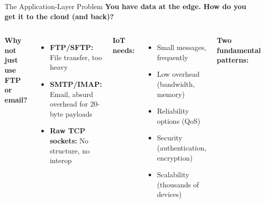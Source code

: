 \documentclass[aspectratio=169,11pt]{beamer}
\begin{document}
\begin{frame}{The Application-Layer Problem}
    \textbf{You have data at the edge. How do you get it to the cloud (and back)?}
    
    \vspace{0.2cm}
    \begin{columns}
        \textbf{Why not just use FTP or email?}
        \begin{itemize}
            \item \textbf{FTP/SFTP:} File transfer, too heavy
            \item \textbf{SMTP/IMAP:} Email, absurd overhead for 20-byte payloads
            \item \textbf{Raw TCP sockets:} No structure, no interop
        \end{itemize}
        
        \vspace{0.15cm}
        \textbf{IoT needs:}
        \begin{itemize}
            \item Small messages, frequently
            \item Low overhead (bandwidth, memory)
            \item Reliability options (QoS)
            \item Security (authentication, encryption)
            \item Scalability (thousands of devices)
        \end{itemize}
        
        \textbf{Two fundamental patterns:}
        
        \vspace{0.15cm}
        \begin{center}
\end{center}
\end{columns}
\end{frame}
\end{document}
